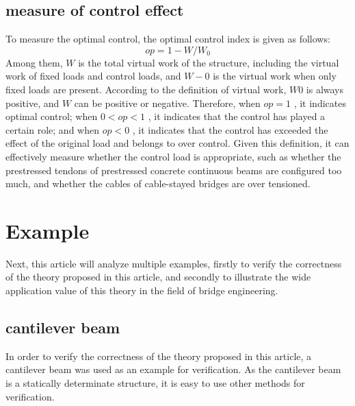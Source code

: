 \subsection {measure of control effect}
To measure the optimal control, the optimal control index is given as follows:
\begin{equation}\label{eq:(zxxgyl.4.1)} 
op=1-W/W_0
\end{equation}  
Among them, $ W $ is the total virtual work of the structure, including the virtual work of fixed loads and control loads, and $ W-0 $ is the virtual work when only fixed loads are present.
According to the definition of virtual work, $ W0 $ is always positive, and $ W $ can be positive or negative. Therefore, when $ op=1 $ , it indicates optimal control; when $ 0<op<1 $ , it indicates that the control has played a certain role; and when $ op<0 $ , it indicates that the control has exceeded the effect of the original load and belongs to over control. Given this definition, it can effectively measure whether the control load is appropriate, such as whether the prestressed tendons of prestressed concrete continuous beams are configured too much, and whether the cables of cable-stayed bridges are over tensioned.


\section {Example} \label{sec: example}
Next, this article will analyze multiple examples, firstly to verify the correctness of the theory proposed in this article, and secondly to illustrate the wide application value of this theory in the field of bridge engineering.
\subsection {cantilever beam}
In order to verify the correctness of the theory proposed in this article, a cantilever beam was used as an example for verification. As the cantilever beam is a statically determinate structure, it is easy to use other methods for verification.

